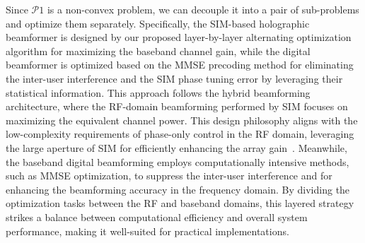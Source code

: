 \documentclass[lettersize,journal]{IEEEtran}
\theoremstyle{remark}
\begin{document}
Since $\mathcal{P}\mathrm{1}$ is a non-convex problem, we can decouple it into a pair of sub-problems and optimize them separately. Specifically, the SIM-based holographic beamformer is designed by our proposed layer-by-layer alternating optimization algorithm for maximizing the baseband channel gain, while the digital beamformer is optimized based on the MMSE precoding method for eliminating the inter-user interference and the SIM phase tuning error by leveraging their statistical information. This approach follows the hybrid beamforming architecture, where the RF-domain beamforming performed by SIM focuses on maximizing the equivalent channel power. This design philosophy aligns with the low-complexity requirements of phase-only control in the RF domain, leveraging the large aperture of SIM for efficiently enhancing the array gain~\cite{ni2015hybrid}. Meanwhile, the baseband digital beamforming employs computationally intensive methods, such as MMSE optimization, to suppress the inter-user interference and for enhancing the beamforming accuracy in the frequency domain. By dividing the optimization tasks between the RF and baseband domains, this layered strategy strikes a balance between computational efficiency and overall system performance, making it well-suited for practical implementations.
\end{document}
